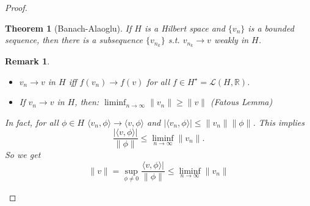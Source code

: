 \documentclass{report}
\theoremstyle{tommy}
\newtheorem{thm}[defn]{Theorem}
\newtheorem{rem}[defn]{Remark}
\begin{document}
\begin{proof}
\begin{itemize}
      \begin{thm}[Banach-Alaoglu]\label{banach-alagoglu}
        If \(H\) is a Hilbert space and \(\{v_n\}\) is a bounded sequence, then there is a subsequence \(\{v_{n_k}\}\) s.t. \(v_{n_k} \to v\) weakly in \(H\).
      \end{thm}

      \begin{rem}
        \begin{itemize}
          \item \(v_n \to v\) in \(H\) iff \(f(v_n) \to f(v)\) for all \(f \in H^\star = \mathcal{L}(H, \mathbb{R})\).
          \item If \(v_n \to v\) in \(H\), then: \(\liminf_{n \to \infty} \|v_n\| \ge \|v\|\) (Fatous Lemma)
        \end{itemize}
        In fact, for all \(\phi \in H\) \(\langle v_n, \phi \rangle \to \langle v, \phi \rangle\) and \(|\langle v_n, \phi\rangle| \le \|v_n\| \|\phi\|\). This implies 
        \[\frac{|\langle v, \phi \rangle|}{\|\phi\|} \le \liminf_{n \to \infty} \|v_n\|.\] So we get 
        \[\|v\| = \sup_{\phi \ne 0} \frac{\langle v, \phi\rangle|}{\|\phi\|} \le \liminf_{n \to \infty} \|v_n\|\] 
      \end{rem}


\end{itemize}
\end{proof}
\end{document}
